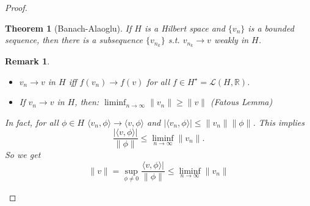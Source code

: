 \documentclass{report}
\theoremstyle{tommy}
\newtheorem{thm}[defn]{Theorem}
\newtheorem{rem}[defn]{Remark}
\begin{document}
\begin{proof}
\begin{itemize}
      \begin{thm}[Banach-Alaoglu]\label{banach-alagoglu}
        If \(H\) is a Hilbert space and \(\{v_n\}\) is a bounded sequence, then there is a subsequence \(\{v_{n_k}\}\) s.t. \(v_{n_k} \to v\) weakly in \(H\).
      \end{thm}

      \begin{rem}
        \begin{itemize}
          \item \(v_n \to v\) in \(H\) iff \(f(v_n) \to f(v)\) for all \(f \in H^\star = \mathcal{L}(H, \mathbb{R})\).
          \item If \(v_n \to v\) in \(H\), then: \(\liminf_{n \to \infty} \|v_n\| \ge \|v\|\) (Fatous Lemma)
        \end{itemize}
        In fact, for all \(\phi \in H\) \(\langle v_n, \phi \rangle \to \langle v, \phi \rangle\) and \(|\langle v_n, \phi\rangle| \le \|v_n\| \|\phi\|\). This implies 
        \[\frac{|\langle v, \phi \rangle|}{\|\phi\|} \le \liminf_{n \to \infty} \|v_n\|.\] So we get 
        \[\|v\| = \sup_{\phi \ne 0} \frac{\langle v, \phi\rangle|}{\|\phi\|} \le \liminf_{n \to \infty} \|v_n\|\] 
      \end{rem}


\end{itemize}
\end{proof}
\end{document}
